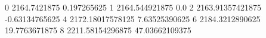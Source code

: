 0 2164.7421875 0.197265625
1 2164.544921875 0.0
2 2163.91357421875 -0.63134765625
4 2172.18017578125 7.63525390625
6 2184.3212890625 19.7763671875
8 2211.58154296875 47.03662109375

